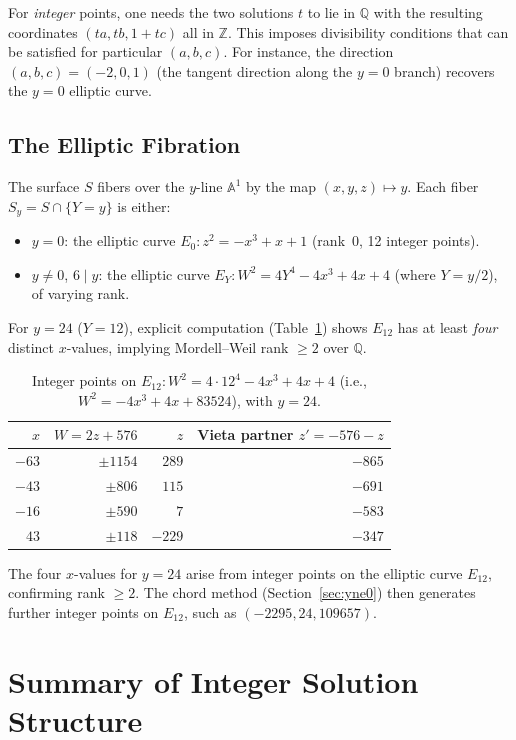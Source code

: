 \documentclass[12pt,a4paper]{article}
\theoremstyle{definition}
\newcommand{\Z}{\mathbb{Z}}
\newcommand{\Q}{\mathbb{Q}}
\newcommand{\A}{\mathbb{A}}
\begin{document}
For \emph{integer} points, one needs the two solutions $t$ to lie in $\Q$
with the resulting coordinates $(ta, tb, 1+tc)$ all in $\Z$.  This imposes
divisibility conditions that can be satisfied for particular $(a,b,c)$.  For
instance, the direction $(a,b,c) = (-2,0,1)$ (the tangent direction along
the $y=0$ branch) recovers the $y=0$ elliptic curve.

\subsection{The Elliptic Fibration}

The surface $S$ fibers over the $y$-line $\A^1$ by the map
$(x,y,z)\mapsto y$.  Each fiber $S_y = S\cap\{Y=y\}$ is either:
\begin{itemize}
  \item $y=0$: the elliptic curve $E_0: z^2 = -x^3+x+1$ (rank~$0$, 12 integer points).
  \item $y\ne0$, $6\mid y$: the elliptic curve $E_Y: W^2 = 4Y^4-4x^3+4x+4$
        (where $Y=y/2$), of varying rank.
\end{itemize}
For $y=24$ ($Y=12$), explicit computation (Table~\ref{tab:y24}) shows
$E_{12}$ has at least \emph{four} distinct $x$-values, implying
Mordell--Weil rank $\ge 2$ over $\Q$.

\begin{table}[h]
\centering
\caption{Integer points on $E_{12}: W^2 = 4\cdot 12^4 - 4x^3+4x+4$ (i.e., $W^2=-4x^3+4x+83524$), with $y=24$.}
\label{tab:y24}
\begin{tabular}{rrrr}
\toprule
$x$ & $W=2z+576$ & $z$ & Vieta partner $z'=-576-z$ \\
\midrule
$-63$ & $\pm 1154$ & $289$ & $-865$ \\
$-43$ & $\pm 806$  & $115$ & $-691$ \\
$-16$ & $\pm 590$  & $7$   & $-583$ \\
$43$  & $\pm 118$  & $-229$ & $-347$ \\
\bottomrule
\end{tabular}
\end{table}

\noindent
The four $x$-values for $y=24$ arise from integer points on the elliptic
curve $E_{12}$, confirming rank $\ge 2$.  The chord method (Section~\ref{sec:yne0})
then generates further integer points on $E_{12}$, such as $(-2295, 24, 109657)$.

\section{Summary of Integer Solution Structure}
\label{sec:summary}
\end{document}
